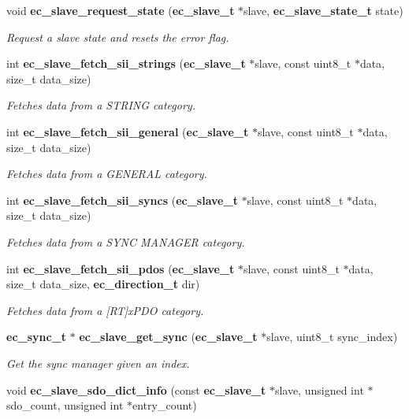 \begin{DoxyCompactItemize}
void {\bf ec\-\_\-slave\-\_\-request\-\_\-state} ({\bf ec\-\_\-slave\-\_\-t} $\ast$slave, {\bf ec\-\_\-slave\-\_\-state\-\_\-t} state)
\begin{DoxyCompactList}\small\item\em Request a slave state and resets the error flag. \end{DoxyCompactList}\item 
int {\bf ec\-\_\-slave\-\_\-fetch\-\_\-sii\-\_\-strings} ({\bf ec\-\_\-slave\-\_\-t} $\ast$slave, const uint8\-\_\-t $\ast$data, size\-\_\-t data\-\_\-size)
\begin{DoxyCompactList}\small\item\em Fetches data from a S\-T\-R\-I\-N\-G category. \end{DoxyCompactList}\item 
int {\bf ec\-\_\-slave\-\_\-fetch\-\_\-sii\-\_\-general} ({\bf ec\-\_\-slave\-\_\-t} $\ast$slave, const uint8\-\_\-t $\ast$data, size\-\_\-t data\-\_\-size)
\begin{DoxyCompactList}\small\item\em Fetches data from a G\-E\-N\-E\-R\-A\-L category. \end{DoxyCompactList}\item 
int {\bf ec\-\_\-slave\-\_\-fetch\-\_\-sii\-\_\-syncs} ({\bf ec\-\_\-slave\-\_\-t} $\ast$slave, const uint8\-\_\-t $\ast$data, size\-\_\-t data\-\_\-size)
\begin{DoxyCompactList}\small\item\em Fetches data from a S\-Y\-N\-C M\-A\-N\-A\-G\-E\-R category. \end{DoxyCompactList}\item 
int {\bf ec\-\_\-slave\-\_\-fetch\-\_\-sii\-\_\-pdos} ({\bf ec\-\_\-slave\-\_\-t} $\ast$slave, const uint8\-\_\-t $\ast$data, size\-\_\-t data\-\_\-size, {\bf ec\-\_\-direction\-\_\-t} dir)
\begin{DoxyCompactList}\small\item\em Fetches data from a [R\-T]x\-P\-D\-O category. \end{DoxyCompactList}\item 
{\bf ec\-\_\-sync\-\_\-t} $\ast$ {\bf ec\-\_\-slave\-\_\-get\-\_\-sync} ({\bf ec\-\_\-slave\-\_\-t} $\ast$slave, uint8\-\_\-t sync\-\_\-index)
\begin{DoxyCompactList}\small\item\em Get the sync manager given an index. \end{DoxyCompactList}\item 
void {\bf ec\-\_\-slave\-\_\-sdo\-\_\-dict\-\_\-info} (const {\bf ec\-\_\-slave\-\_\-t} $\ast$slave, unsigned int $\ast$sdo\-\_\-count, unsigned int $\ast$entry\-\_\-count)

\end{DoxyCompactItemize}
